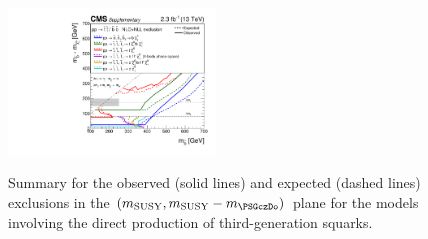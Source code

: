 \clearpage
\begin{figure}[!h]
  \begin{center}
    \includegraphics[width=0.49\textwidth]{allThirdGenZoomSUMMARY_transposed_aux} \\
    \caption{Summary for the observed (solid lines) and expected
      (dashed lines) exclusions in the $(m_{\mathrm{SUSY}},
      m_{\mathrm{SUSY}} - m_{\PSGczDo})$ plane for the models
      involving the direct production of third-generation squarks. 
      \label{fig:third-gen-summary-zoomed-plots} }
  \end{center}
\end{figure}

